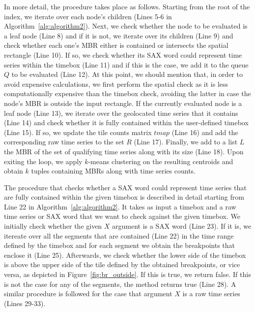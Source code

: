 In more detail, the procedure takes place as follows. Starting from the root of the \hisax index, we iterate over each node's children (Lines 5-6 in Algorithm~\ref{alg:algorithm2}). Next, we check whether the node to be evaluated is a leaf node (Line 8) and if it is not, we iterate over its children (Line 9) and check whether each one's MBR either is contained or intersects the spatial rectangle (Line 10). If so, we check whether its SAX word could represent time series within the timebox (Line 11) and if this is the case, we add it to the queue $Q$ to be evaluated (Line 12). At this point, we should mention that, in order to avoid expensive calculations, we first perform the spatial check as it is less computationally expensive than the timebox check, avoiding the latter in case the node's MBR is outside the input rectangle. If the currently evaluated node is a leaf node (Line 13), we iterate over the geolocated time series that it contains (Line 14) and check whether it is fully contained within the user-defined timebox (Line 15). If so, we update the tile counts matrix $tmap$ (Line 16) and add the corresponding raw time series to the set $R$ (Line 17). Finally, we add to a list $L$ the MBR of the set of qualifying time series along with its size (Line 18). Upon exiting the loop, we apply $k$-means clustering on the resulting centroids and obtain $k$ tuples containing MBRs along with time series counts. 

The procedure that checks whether a SAX word could represent time series that are fully contained within the given timebox is described in detail starting from Line 22 in Algorithm~\ref{alg:algorithm2}. It takes as input a timebox and a raw time series or SAX word that we want to check against the given timebox. We initially check whether the given $X$ argument is a SAX word (Line 23). If it is, we itereate over all the segments that are contained (Line 22) in the time range defined by the timebox and for each segment we obtain the \isax breakpoints that enclose it (Line 25). Afterwards, we check whether the lower side of the timebox is above the upper side of the tile defined by the obtained breakpoints, or vice versa, as depicted in Figure~\ref{fig:br_outside}. If this is true, we return false. If this is not the case for any of the segments, the method returns true (Line 28). A similar procedure is followed for the case that argument $X$ is a raw time series (Lines 29-33).